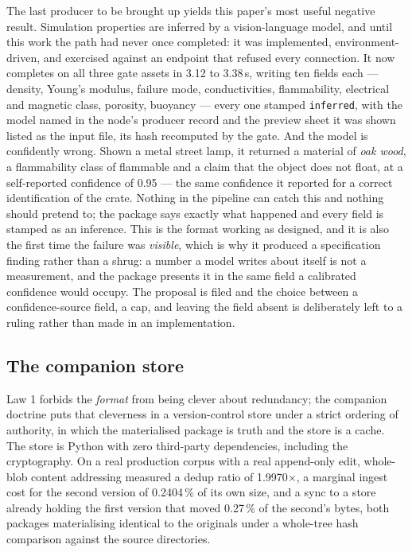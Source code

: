 \documentclass[10pt,twocolumn,letterpaper]{article}
\newcommand{\code}[1]{\texttt{\small #1}}
\begin{document}
The last producer to be brought up yields this paper's most useful negative result. Simulation properties are inferred by a vision-language model, and until this work the path had never once completed: it was implemented, environment-driven, and exercised against an endpoint that refused every connection. It now completes on all three gate assets in 3.12 to 3.38\,s, writing ten fields each --- density, Young's modulus, failure mode, conductivities, flammability, electrical and magnetic class, porosity, buoyancy --- every one stamped \code{inferred}, with the model named in the node's producer record and the preview sheet it was shown listed as the input file, its hash recomputed by the gate. And the model is confidently wrong. Shown a metal street lamp, it returned a material of \emph{oak wood}, a flammability class of flammable and a claim that the object does not float, at a self-reported confidence of 0.95 --- the same confidence it reported for a correct identification of the crate. Nothing in the pipeline can catch this and nothing should pretend to; the package says exactly what happened and every field is stamped as an inference. This is the format working as designed, and it is also the first time the failure was \emph{visible}, which is why it produced a specification finding rather than a shrug: a number a model writes about itself is not a measurement, and the package presents it in the same field a calibrated confidence would occupy. The proposal is filed and the choice between a confidence-source field, a cap, and leaving the field absent is deliberately left to a ruling rather than made in an implementation.

\subsection{The companion store}

Law 1 forbids the \emph{format} from being clever about redundancy; the companion doctrine puts that cleverness in a version-control store under a strict ordering of authority, in which the materialised package is truth and the store is a cache. The store is Python with zero third-party dependencies, including the cryptography. On a real production corpus with a real append-only edit, whole-blob content addressing measured a dedup ratio of 1.9970$\times$, a marginal ingest cost for the second version of 0.2404\,\% of its own size, and a sync to a store already holding the first version that moved 0.27\,\% of the second's bytes, both packages materialising identical to the originals under a whole-tree hash comparison against the source directories.
\end{document}
